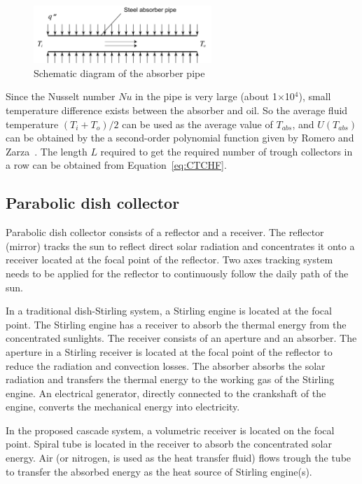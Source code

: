 \begin{figure}[!ht]
\centering
\includegraphics[width=0.6\textwidth]{fig/Pipe.pdf}
\caption{Schematic diagram of the absorber pipe}\label{fig:Pipe}
\end{figure}


Since the Nusselt number $Nu$ in the pipe is very large (about 1$\times$10$^4$), small temperature difference exists between the absorber and oil. So the average fluid temperature $(T_{i}+T_{o})/2$ can be used as the average value of $T_{abs}$, and $U(T_{abs})$ can be obtained by the a second-order polynomial function given by Romero and Zarza~\cite{Romero2007}. The length $L$ required to get the required number of trough collectors in a row can be obtained from Equation~\ref{eq:CTCHF}.

\subsection{Parabolic dish collector}

Parabolic dish collector consists of a reflector and a receiver. The reflector (mirror) tracks the sun to reflect direct solar radiation and concentrates it onto a receiver located at the focal point of the reflector. Two axes tracking system needs to be applied for the reflector to continuously follow the daily path of the sun.

In a traditional dish-Stirling system, a Stirling engine is located at the focal point. The Stirling engine has a receiver to absorb the thermal energy from the concentrated sunlights. The receiver consists of an aperture and an absorber. The aperture in a Stirling receiver is located at the focal point of the reflector to reduce the radiation and convection losses. The absorber absorbs the solar radiation and transfers the thermal energy to the working gas of the Stirling engine. An electrical generator, directly connected to the crankshaft of the engine, converts the mechanical energy into electricity. 

In the proposed cascade system, a volumetric receiver is located on the focal point. Spiral tube is located in the receiver to absorb the concentrated solar energy. Air (or nitrogen, is used as the heat transfer fluid) flows trough the tube to transfer the absorbed energy as the heat source of Stirling engine(s).

